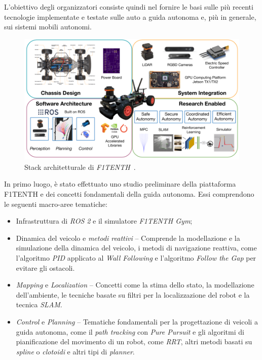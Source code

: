 L'obiettivo degli organizzatori consiste quindi nel fornire le basi sulle più
recenti tecnologie implementate e testate sulle auto a guida autonoma e, più in generale, sui sistemi mobili autonomi.
\begin{figure}[H]
    \centering
    \includegraphics[width=\textwidth]{images/F110_architecture.png}
    \caption{Stack architetturale di \textit{F1TENTH}~\cite{learnf1tenth}.}
    \label{fig:fig2} %
\end{figure}
\noindent In primo luogo, è stato effettuato uno studio preliminare della piattaforma F1TENTH e dei concetti 
fondamentali della guida autonoma. Essi comprendono le seguenti macro-aree tematiche:
\begin{itemize}
    \item Infrastruttura di \textit{ROS 2} e il simulatore \textit{F1TENTH Gym};
    \item Dinamica del veicolo e \textit{metodi reattivi} -- Comprende la modellazione e la 
    simulazione della dinamica del veicolo, i metodi
    di navigazione reattiva, come l'algoritmo 
    \textit{PID} applicato al \textit{Wall Following} e l'algoritmo \textit{Follow the Gap} per evitare gli ostacoli.
    \item \textit{Mapping} e \textit{Localization} -- Concetti come la stima dello stato, la 
    modellazione dell'ambiente, le tecniche basate su filtri per la localizzazione del robot e la tecnica \textit{SLAM}.
    \item \textit{Control} e \textit{Planning} -- Tematiche fondamentali per la progettazione di 
    veicoli a guida autonoma, come il \textit{path tracking} con \textit{Pure Pursuit}
    e gli algoritmi di pianificazione del movimento di un robot, come \textit{RRT}, 
    altri metodi basati su \textit{spline} o \textit{clotoidi} e altri tipi di \textit{planner}.
\end{itemize}
